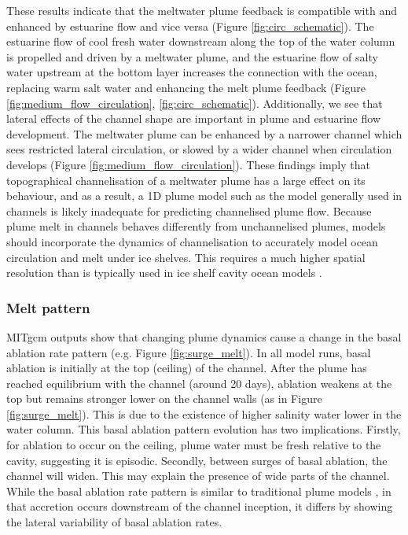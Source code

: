 These results indicate that the meltwater plume feedback is compatible with and enhanced by estuarine flow and vice versa (Figure \ref{fig:circ_schematic}). The estuarine flow of cool fresh water downstream along the top of the water column is propelled and driven by a meltwater plume, and the estuarine flow of salty water upstream at the bottom layer increases the connection with the ocean, replacing warm salt water and enhancing the melt plume feedback (Figure \ref{fig:medium_flow_circulation}, \ref{fig:circ_schematic}).
Additionally, we see that lateral effects of the channel shape are important in plume and estuarine flow development. The meltwater plume can be enhanced by a narrower channel which sees restricted lateral circulation, or slowed by a wider channel when circulation develops (Figure \ref{fig:medium_flow_circulation}). 
These findings imply that topographical channelisation of a meltwater plume has a large effect on its behaviour, and as a result, a 1D plume model such as the \cite{jenkins2011convection} model generally used in channels \citep[e.g.][]{marsh2016high} is likely inadequate for predicting channelised plume flow.
Because plume melt in channels behaves differently from unchannelised plumes, models should incorporate the dynamics of channelisation to accurately model ocean circulation and melt under ice shelves. This requires a much higher spatial resolution than is typically used in ice shelf cavity ocean models \cite[e.g.][]{holland2003modelling}. 

\subsubsection{Melt pattern}

MITgcm outputs show that changing plume dynamics cause a change in the basal ablation rate pattern (e.g. Figure \ref{fig:surge_melt}). In all model runs, basal ablation is initially at the top (ceiling) of the channel. After the plume has reached equilibrium with the channel (around 20 days), ablation weakens at the top but remains stronger lower on the channel walls (as in Figure \ref{fig:surge_melt}). This is due to the existence of higher salinity water lower in the water column. This basal ablation pattern evolution has two implications. Firstly, for ablation to occur on the ceiling, plume water must be fresh {relative} to the cavity, suggesting it is episodic. Secondly, between surges of basal ablation, the channel will widen. This may explain the presence of wide parts of the channel.
While the basal ablation rate pattern is similar to traditional plume models \citep[e.g.][]{jenkins2011convection}, in that accretion occurs downstream of the channel inception, it differs by showing the lateral variability of basal ablation rates. 

